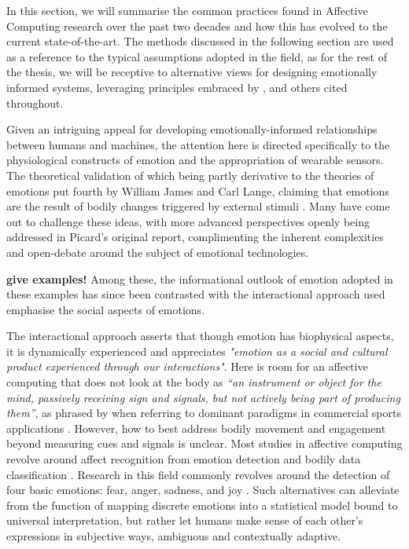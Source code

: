 In this section, we will summarise the common practices found in Affective Computing research over the past two decades and how this has evolved to the current state-of-the-art. The methods discussed in the following section are used as a reference to the typical assumptions adopted in the field, as for the rest of the thesis, we will be receptive to alternative views for designing emotionally informed systems, leveraging principles embraced by \citeauthor{hook_interactional_2008} \cite{hook_interactional_2008}, \citeauthor{barrett_functionalism_2017} \cite{barrett_functionalism_2017} and others cited throughout.

Given an intriguing appeal for developing emotionally-informed relationships between humans and machines, the attention here is directed specifically to the physiological constructs of emotion and the appropriation of wearable sensors. The theoretical validation of which being partly derivative to the theories of emotions put fourth by William James and Carl Lange, claiming that emotions are the result of bodily changes triggered by external stimuli \cite{james_principles_1890,cannon_james-lange_1927}. Many have come out to challenge these ideas, with more advanced perspectives openly being addressed in Picard's original report, complimenting the inherent complexities and open-debate around the subject of emotional technologies.

\textbf{give examples!}
Among these, the informational outlook of emotion adopted in these examples has since been contrasted with the interactional approach used emphasise the social aspects of emotions.

The interactional approach asserts that though emotion has biophysical aspects, it is dynamically experienced and appreciates \textit{"emotion as a social and cultural product experienced through our interactions"}. Here is room for an affective computing that does not look at the body as \textit{“an instrument or object for the mind, passively receiving sign and signals, but not actively being part of producing them”}, as phrased by \citeauthor{hook_kristina_affective_2012} when referring to dominant paradigms in commercial sports applications \cite{hook_kristina_affective_2012}. However, how to best address bodily movement and engagement beyond measuring cues and signals is unclear. Most studies in affective computing revolve around affect recognition from emotion detection and bodily data classification \cite{bota_review_2019}. Research in this field commonly revolves around the detection of four basic emotions: fear, anger, sadness, and joy \cite{picard_mit_nodate}. Such alternatives can alleviate from the function of mapping discrete emotions into a statistical model bound to universal interpretation, but rather let humans make sense of each other's expressions in subjective ways, ambiguous and contextually adaptive.

